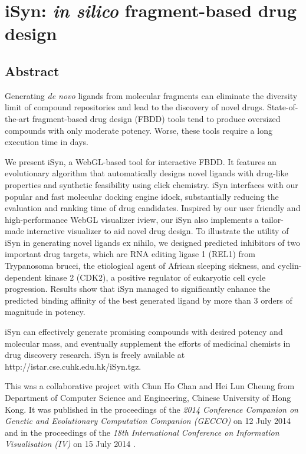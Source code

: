 \chapter{iSyn: \textit{in silico} fragment-based drug design}

\section{Abstract}

Generating \textit{de novo} ligands from molecular fragments can eliminate the diversity limit of compound repositories and lead to the discovery of novel drugs. State-of-the-art fragment-based drug design (FBDD) tools tend to produce oversized compounds with only moderate potency. Worse, these tools require a long execution time in days.

We present iSyn, a WebGL-based tool for interactive FBDD. It features an evolutionary algorithm that automatically designs novel ligands with drug-like properties and synthetic feasibility using click chemistry. iSyn interfaces with our popular and fast molecular docking engine idock, substantially reducing the evaluation and ranking time of drug candidates. Inspired by our user friendly and high-performance WebGL visualizer iview, our iSyn also implements a tailor-made interactive visualizer to aid novel drug design. To illustrate the utility of iSyn in generating novel ligands ex nihilo, we designed predicted inhibitors of two important drug targets, which are RNA editing ligase 1 (REL1) from Trypanosoma brucei, the etiological agent of African sleeping sickness, and cyclin-dependent kinase 2 (CDK2), a positive regulator of eukaryotic cell cycle progression. Results show that iSyn managed to significantly enhance the predicted binding affinity of the best generated ligand by more than 3 orders of magnitude in potency.

iSyn can effectively generate promising compounds with desired potency and molecular mass, and eventually supplement the efforts of medicinal chemists in drug discovery research. iSyn is freely available at http://istar.cse.cuhk.edu.hk/iSyn.tgz.

This was a collaborative project with Chun Ho Chan and Hei Lun Cheung from Department of Computer Science and Engineering, Chinese University of Hong Kong. It was published in the proceedings of the \textit{2014 Conference Companion on Genetic and Evolutionary Computation Companion (GECCO)} on 12 July 2014 \citep{1409} and in the proceedings of the \textit{18th International Conference on Information Visualisation (IV)} on 15 July 2014 \citep{1387}.

